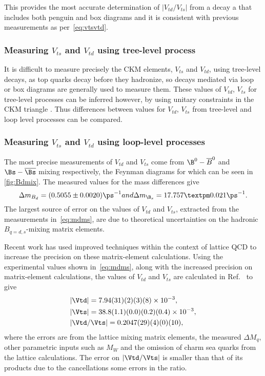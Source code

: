 This provides the most accurate determination of $|V_{td}/V_{ts}|$ from a decay a that includes both penguin and box diagrams and it is consistent with previous measurements as per~\autoref{eq:vtsvtd}.


\subsubsection{Measuring $V_{ts}$ and $V_{td}$ using tree-level process}
It is difficult to measure precisely the CKM elements, $V_{ts}$ and $V_{td}$, using tree-level decays, as top quarks decay before they
hadronize,  so decays mediated via loop or box diagrams are generally used to
measure them. These values of $V_{td}$, $V_{ts}$ for tree-level
processes can be inferred however, by using unitary constraints
in the CKM triangle \cite{ckm}. Thus differences between values for $V_{td}$, $V_{ts}$ from tree-level and loop level processes can be compared. 
\subsubsection{Measuring $V_{ts}$ and $V_{td}$ using loop-level processes}
\label{subsubsec:loop}
The most precise measurements of $V_{td}$ and $V_{ts}$ come from
$\B^{0}-\overline{B}^{0}$ and $\Bs-\overline{\Bs}$ mixing
respectively, the Feynman diagrams for which can be seen in
\autoref{fig:Bdmix}.
The measured values for the mass differences give \cite{pdg} \cite{bslhcb}
\begin{equation}
  \Delta m_{B_{d}} = (0.5055\pm0.0020)\ps^{-1}  $$and$$
\Delta m_{\B_{s}} = 17.757 ± 0.021\ps^{-1}.
\label{eq:mdms}
\end{equation}
The largest source of error on the values of $V_{td}$ and $V_{ts}$,
extracted from the measurements in~\autoref{eq:mdms}, are due to theoretical uncertainties on the hadronic $B_{q = d,s}$-mixing matrix elements.


Recent work \cite{vtdvts} has used improved
techniques within the context of lattice QCD to increase the
precision on these  matrix-element calculations. Using the
experimental values shown in~\autoref{eq:mdms}, along with the
increased precision on matrix-element calculations, the values of
$V_{td}$ and $V_{ts}$ are calculated in Ref.~\cite{vtdvts} to give
\begin{equation}
  \begin{split}
    & |\Vtd| = 7.94(31)(2)(3)(8)\times 10^{-3},\\
& |\Vts| = 38.8(1.1)(0.0)(0.2)(0.4)\times 10^{-3},\\
& |\Vtd/\Vts| = 0.2047(29)(4)(0)(10),
  \end{split}
\end{equation}
where the errors are from the lattice mixing matrix elements, the measured $\Delta M_{q}$, other parametric inputs such as $M_{W}$ and the omission of charm sea quarks from the lattice calculations. The error on $|\Vtd/\Vts|$ is smaller than that of its products due to the cancellations some errors in the ratio.

